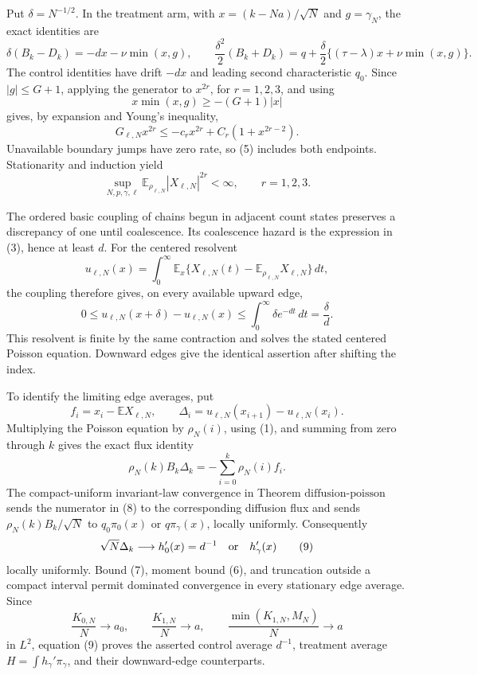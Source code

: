 Put \(\delta=N^{-1/2}\).  In the treatment arm, with \(x=(k-Na)/\sqrt N\) and \(g=\gamma_N\), the exact identities are
\[
 \delta(B_k-D_k)=-dx-\nu\min(x,g),
 \qquad
 \frac{\delta^2}{2}(B_k+D_k)
 =q+\frac\delta2\{(\tau-\lambda)x+\nu\min(x,g)\}.            \tag{4}
\]
The control identities have drift \(-dx\) and leading second characteristic \(q_0\).  Since \(|g|\leq G+1\), applying the generator to \(x^{2r}\), for \(r=1,2,3\), and using
\[
 x\min(x,g)\geq-(G+1)|x|
\]
gives, by expansion and Young's inequality,
\[
 G_{\ell,N}x^{2r}\leq-c_r x^{2r}+C_r(1+x^{2r-2}).             \tag{5}
\]
Unavailable boundary jumps have zero rate, so (5) includes both endpoints.  Stationarity and induction yield
\[
 \sup_{N,p,\gamma,\ell}
 \mathbb E_{\rho_{\ell,N}}|X_{\ell,N}|^{2r}<\infty,
 \qquad r=1,2,3.                                               \tag{6}
\]

The ordered basic coupling of chains begun in adjacent count states preserves a discrepancy of one until coalescence.  Its coalescence hazard is the expression in (3), hence at least \(d\).  For the centered resolvent
\[
 u_{\ell,N}(x)=\int_0^\infty
 \mathbb E_x\{X_{\ell,N}(t)-\mathbb E_{\rho_{\ell,N}}X_{\ell,N}\}\,dt,
\]
the coupling therefore gives, on every available upward edge,
\[
 0\leq u_{\ell,N}(x+\delta)-u_{\ell,N}(x)
 \leq\int_0^\infty\delta e^{-dt}\,dt=\frac\delta d.          \tag{7}
\]
This resolvent is finite by the same contraction and solves the stated centered Poisson equation.  Downward edges give the identical assertion after shifting the index.

To identify the limiting edge averages, put
\[
 f_i=x_i-\mathbb E X_{\ell,N},
 \qquad
 \Delta_i=u_{\ell,N}(x_{i+1})-u_{\ell,N}(x_i).
\]
Multiplying the Poisson equation by \(\rho_N(i)\), using (1), and summing from zero through \(k\) gives the exact flux identity
\[
 \rho_N(k)B_k\Delta_k=-\sum_{i=0}^k\rho_N(i)f_i.              \tag{8}
\]
The compact-uniform invariant-law convergence in Theorem \(\mathrm{diffusion\mbox{-}poisson}\) sends the numerator in (8) to the corresponding diffusion flux and sends \(\rho_N(k)B_k/\sqrt N\) to \(q_0\pi_0(x)\) or \(q\pi_\gamma(x)\), locally uniformly.  Consequently
\[
 \sqrt N\Delta_k\longrightarrow h_0'(x)=d^{-1}
 \quad\hbox{or}\quad h_\gamma'(x)                            \tag{9}
\]
locally uniformly.  Bound (7), moment bound (6), and truncation outside a compact interval permit dominated convergence in every stationary edge average.  Since
\[
 \frac{K_{0,N}}N\to a_0,
 \qquad \frac{K_{1,N}}N\to a,
 \qquad \frac{\min(K_{1,N},M_N)}N\to a                       \tag{10}
\]
in \(L^2\), equation (9) proves the asserted control average \(d^{-1}\), treatment average \(H=\int h_\gamma'\pi_\gamma\), and their downward-edge counterparts.

